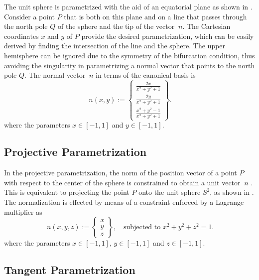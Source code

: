 \documentclass[12pt]{article}
\numberwithin{equation}{section}
\begin{document}
The unit sphere is parametrized with the aid of an equatorial plane as
shown in .  Consider a point $P$ that is both
on this plane and on a line that passes through the north pole $Q$ of
the sphere and the tip of the vector $~n$. The Cartesian coordinates
$x$ and $y$ of $P$ provide the desired parametrization, which can be
easily derived by finding the intersection of the line and the
sphere. The upper hemisphere can be ignored due to the symmetry of the
bifurcation condition, thus avoiding the singularity in parametrizing
a normal vector that points to the north pole $Q$. The normal vector
$~n$ in terms of the canonical basis is
\begin{equation}
  ~n(x,y)
  :=
  \begin{Bmatrix}
    \frac{\displaystyle 2x}{\displaystyle x^2+y^2+1}
    \\[0.9em]
    \frac{\displaystyle 2y}{\displaystyle x^2+y^2+1}
    \\[0.9em]
    \frac{\displaystyle x^2+y^2-1}{\displaystyle x^2+y^2+1}
  \end{Bmatrix}.
\end{equation}
where the parameters $x \in [-1, 1]$ and $y \in [-1, 1]$.

\subsection{Projective Parametrization}
\label{subsec:projective}

In the projective parametrization, the norm of the position vector of
a point $P$ with respect to the center of the sphere is constrained to
obtain a unit vector $~n$ \citep{Ortiz.etal:1987}. This is
equivalent to projecting the point $P$ onto the unit sphere $S^2$, as
shown in . The normalization is effected
by means of a constraint enforced by a Lagrange multiplier as
\begin{equation}
  ~n(x,y,z)
  :=
  \begin{Bmatrix}
    x
    \\
    y
    \\
    z
  \end{Bmatrix},
  \quad
  \text{subjected to } x^2+y^2+z^2 = 1.
\end{equation}
where the parameters $x \in [-1, 1]$, $y \in [-1, 1]$
and $z \in [-1, 1]$.

\subsection{Tangent Parametrization}
\label{subsec:tangent}
\end{document}
